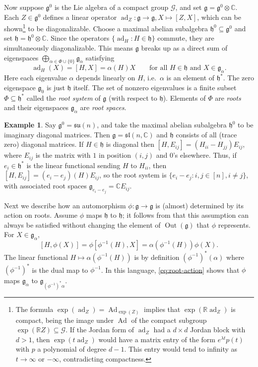\documentclass[reqno]{amsart}
\theoremstyle{definition} \newtheorem{example}[theorem]{Example}
\newcommand{\CC}{\mathbb{C}}
\newcommand{\RR}{\mathbb{R}}
\newcommand{\su}{\mathfrak{su}}
\DeclareMathOperator{\Ad}{Ad}
\DeclareMathOperator{\ad}{ad}
\DeclareMathOperator{\Out}{Out}
\newcommand{\secsymbol}{§}
\newcommand{\G}{\mathcal{G}}
\newcommand{\g}{\mathfrak{g}}
\newcommand{\h}{\mathfrak{h}}
\begin{document}
Now suppose $\g^0$ is the Lie algebra of a compact group $\G$, and set $\g = \g^0 \otimes \CC$. Each $Z \in \g^0$ defines a linear operator $\ad_Z : \g \to \g, X \mapsto [Z,X]$, which can be shown\footnote{The formula $\exp(\ad_Z) = \Ad_{\exp(Z)}$  implies that $\exp(\RR\ad_Z)$ is compact, being the image under $\Ad$ of the compact subgroup $\exp(\RR Z) \subseteq \G$. If the Jordan form of $\ad_Z$ had a $d \times d$ Jordan block with $d > 1$, then $\exp(t\ad_Z)$ would have a matrix entry of the form $e^{\lambda t}p(t)$ with $p$ a polynomial of degree $d-1$. This entry would tend to infinity as $t \to \infty$ or $-\infty$, contradicting compactness.} to be diagonalizable. Choose a maximal abelian subalgebra $\h^0 \subseteq \g^0$ and set $\h = \h^0 \otimes \CC$. Since the operators $\{\ad_H : H \in \h\}$ commute, they are simultaneously diagonalizable. This means $\g$ breaks up as a direct sum of eigenspaces $\bigoplus_{\alpha \in \Phi \cup \{0\}} \g_{\alpha}$ satisfying 
\begin{equation*}
\ad_H(X) = [H,X] = \alpha(H)X \qquad \text{for all $H \in \h$ and $X \in \g_{\alpha}$}.
\end{equation*}
Here each eigenvalue $\alpha$ depends linearly on $H$, i.e.\ $\alpha$ is an element of $\h^*$. The zero eigenspace $\g_0$ is just $\h$ itself. The set of nonzero eigenvalues is a finite subset $\Phi \subseteq \h^*$ called the \emph{root system} of $\g$ (with respect to $\h$). Elements of $\Phi$ are \emph{roots} and their eigenspaces $\g_\alpha$ are \emph{root spaces}.

\begin{example} Say $\g^0 = \su(n)$, and take the maximal abelian subalgebra $\h^0$ to be imaginary diagonal matrices. Then $\g = \mathfrak{sl}(n,\CC)$ and $\h$ consists of all (trace zero) diagonal matrices. If $H \in \h$ is diagonal then $[H, E_{ij}] = (H_{ii}-H_{jj}) E_{ij}$, where $E_{ij}$ is the matrix with $1$ in position $(i,j)$ and $0$'s elsewhere.  Thus, if $e_i \in \h^*$ is the linear functional sending $H$ to $H_{ii}$, then $[H,E_{ij}] = (e_i-e_j)(H) E_{ij}$, so the root system is $\{e_i - e_j : i,j \in [n], i \neq j\}$,  with associated root spaces $\g_{e_i-e_j} = \CC E_{ij}$. \end{example}

Next we describe how an automorphism $\phi : \g \to \g$ is (almost) determined by its action on roots. Assume $\phi$ maps $\h$ to $\h$; it follows from \cite[Ch.\ IV, \secsymbol 16.2]{humphreys} that this assumption can always be satisfied without changing the element of $\Out(\g)$ that $\phi$ represents.  For $X \in \g_\alpha$,
\begin{equation} \label{eq:root-action}
[H, \phi(X)] = \phi [\phi^{-1}(H), X] = \alpha(\phi^{-1}(H)) \phi(X).
\end{equation}
The linear functional $H \mapsto \alpha(\phi^{-1}(H))$ is by definition $(\phi^{-1})^*(\alpha)$ where $(\phi^{-1})^*$ is the dual map to $\phi^{-1}$. In this language, \eqref{eq:root-action} shows that $\phi$ maps $\g_\alpha$ to $\g_{(\phi^{-1})^* \alpha}$. 
\end{document}
